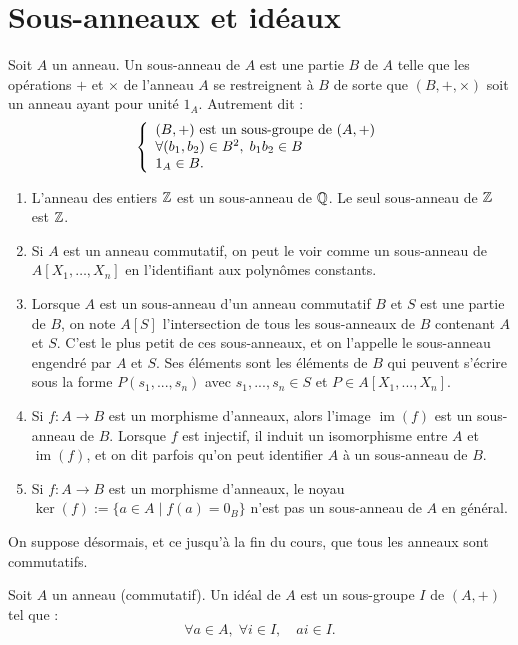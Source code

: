\documentclass[]{report}
\begin{document}
\section{Sous-anneaux et idéaux}

\begin{df}{}{}
    Soit $A$ un anneau. Un sous-anneau de $A$ est une partie $B$ de $A$ telle que les opérations $+$ et $\times$ de l'anneau $A$ se restreignent à $B$ de sorte que $(B, +, \times)$ soit un anneau ayant pour unité $1_A$. Autrement dit :
    \[\left\{\begin{array}{ll} (B, +) \text{ est un sous-groupe de } (A, +) \\ \forall (b_1, b_2) \in B^2, \; b_1 b_2 \in B \\ 1_A \in B. \end{array} \right.\]
\end{df}

\begin{ex}{}{}
    \begin{enumerate}
        \item L'anneau des entiers $\mathbb{Z}$ est un sous-anneau de $\mathbb{Q}$. Le seul sous-anneau de $\mathbb{Z}$ est $\mathbb{Z}$.
        \item Si $A$ est un anneau commutatif, on peut le voir comme un sous-anneau de $A[X_1, \ldots, X_n]$ en l'identifiant aux polynômes constants.
        \item Lorsque $A$ est un sous-anneau d'un anneau commutatif $B$ et $S$ est une partie de $B$, on note $A[S]$ l'intersection de tous les sous-anneaux de $B$ contenant $A$ et $S$. C'est le plus petit de ces sous-anneaux, et on l'appelle le sous-anneau engendré par $A$ et $S$. Ses éléments sont les éléments de $B$ qui peuvent s'écrire sous la forme $P(s_1, ..., s_n)$ avec $s_1, ..., s_n \in S$ et $P \in A[X_1, ..., X_n]$.
        \item Si $f : A \to B$ est un morphisme d'anneaux, alors l'image $\operatorname{im}(f)$ est un sous-anneau de $B$. Lorsque $f$ est injectif, il induit un isomorphisme entre $A$ et $\operatorname{im}(f)$, et on dit parfois qu'on peut identifier $A$ à un sous-anneau de $B$.
        \item Si $f : A \to B$ est un morphisme d'anneaux, le noyau $\ker(f) := \{a \in A \mid f(a) = 0_B\}$ n'est pas un sous-anneau de $A$ en général.
    \end{enumerate}
\end{ex}

On suppose désormais, et ce jusqu'à la fin du cours, que tous les anneaux sont commutatifs.

\begin{df}{}{}
    Soit $A$ un anneau (commutatif). Un idéal de $A$ est un sous-groupe $I$ de $(A, +)$ tel que :
    \[\forall a \in A, \; \forall i \in I, \quad ai \in I.\]
\end{df}
\end{document}
